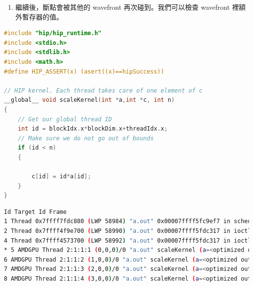 \begin{enumerate}
    繼續我們的範例，我們觀察到暫存器v3將值寫回去主記憶體之前儲存了最終結果。因此，透過檢查的第四行，我們可以看到暫存器v3的值在wavefront 0的所有64個thread。例如，第三個值是0x4，對應這個wavefront的thread ID 2。作為參考，thread ID 2從輸入數組載入值2，將其乘上thread ID的值2並輸出0x4。

    \item 繼續後，斷點會被其他的 wavefront 再次碰到。我們可以檢查 wavefront 裡額外暫存器的值。

\end{enumerate}

\begin{lstlisting}[language=C, caption={純量乘法kernel}, label={lst:Scalar multiply kernel}]
#include "hip/hip_runtime.h"
#include <stdio.h>
#include <stdlib.h>
#include <math.h>
#define HIP_ASSERT(x) (asert((x)==hipSuccess))

// HIP kernel. Each thread takes care of one element of c
__global__ void scaleKernel(int *a,int *c, int n)
{
    // Get our global thread ID
    int id = blockIdx.x*blockDim.x+threadIdx.x;
    // Make sure we do not go out of bounds
    if (id < n)
    {
    
        c[id] = id*a[id];
    }
}
\end{lstlisting}

\begin{lstlisting}[language=bash, caption={info threads指令的輸出}, label={lst:Output of info threads command}]
Id Target Id Frame
1 Thread 0x7ffff7fdc880 (LWP 58984) "a.out" 0x00007ffff5fc9ef7 in sched_yield () from /lib/x86_64-linux-gnu/libc.so.6
2 Thread 0x7ffff4f9e700 (LWP 58990) "a.out" 0x00007ffff5fdc317 in ioctl () from /lib/x86_64-linux-gnu/libc.so.6
4 Thread 0x7ffff4573700 (LWP 58992) "a.out" 0x00007ffff5fdc317 in ioctl () from /lib/x86_64-linux-gnu/libc.so.6
* 5 AMDGPU Thread 2:1:1:1 (0,0,0)/0 "a.out" scaleKernel (a=<optimized out>, c=<optimized out>, n=<optimized out>) at vadd_hip.cpp:20
6 AMDGPU Thread 2:1:1:2 (1,0,0)/0 "a.out" scaleKernel (a=<optimized out>, c=<optimized out>, n=<optimized out>) at vadd_hip.cpp:20
7 AMDGPU Thread 2:1:1:3 (2,0,0)/0 "a.out" scaleKernel (a=<optimized out>, c=<optimized out>, n=<optimized out>) at vadd_hip.cpp:20
8 AMDGPU Thread 2:1:1:4 (3,0,0)/0 "a.out" scaleKernel (a=<optimized out>, c=<optimized out>, n=<optimized out>) at vadd_hip.cpp:20
\end{lstlisting}

